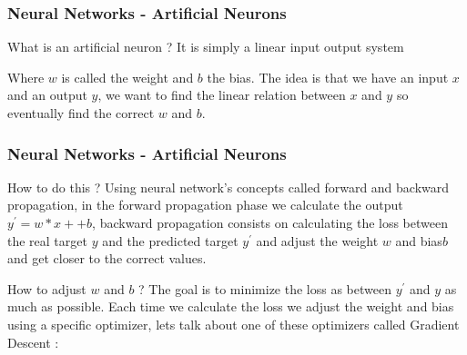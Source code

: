 \documentclass{beamer}
\begin{document}
\begin{frame}
\frametitle{Neural Networks - Artificial Neurons}
\begin{block}{What is an artificial neuron ?}
It is simply a linear input output system
\end{block}
\begin{center}
\end{center}
\begin{block}{}
Where $ w $ is called the weight and $ b $ the bias. The idea is that we have an input $ x $ and an output $ y $, we want to find the linear relation between $ x $ and $ y $ so eventually find the correct $ w $ and $ b $.
\end{block}
\end{frame}

\begin{frame}
\frametitle{Neural Networks - Artificial Neurons}
\begin{block}{How to do this ?}
Using neural network's concepts called forward and backward propagation, in the forward propagation phase we calculate the output $ y^{\prime} = w*x ++ b $, backward propagation consists on calculating the loss between the real target $ y $ and the predicted target $ y^{\prime} $ and adjust the weight $ w $ and bias$ b $ and get closer to the correct values.
\end{block}
\begin{block}{How to adjust $ w $ and $ b $ ?}
The goal is to minimize the loss as between $ y^{\prime} $ and $ y $ as much as possible. Each time we calculate the loss we adjust the weight and bias using a specific optimizer, lets talk about one of these optimizers called Gradient Descent :
\end{block}
\end{frame}
\end{document}
